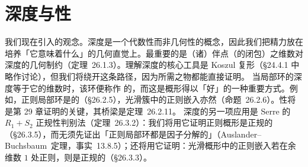 
\chapter{深度与\trCM{}性}
\label{ch:depth}

我们现在引入\trDepth{}的观念。深度是一个代数性而非几何性的概念，因此我们把精力放在培养「它意味着什么」的几何直觉上。最重要的是（诸）伴点（的闭包）之维数对深度的几何制约（\mbox{定理~26.1.3}）。理解深度的核心工具是 Koszul 复形（\S24.4.1 中略作讨论），但我们将绕开这条路径，因为所需之物都能直接证明。
当局部环的深度等于它的维数时，该环便称作 \trCM{}的，而这是概形得以「好」的一种重要方式。例如，正则局部环是\trCM{}的（\S26.2.5），光滑簇中的正则嵌入亦然（\mbox{命题~26.2.6}）。\trCM{}性将是第 29 章\trSerreDuality{}证明的关键，其桥梁是\mbox{\trMiracleFlat{}定理~26.2.11}。
深度的另一项应用是 Serre 的 $R_1+S_2$ 正规性判别法（\mbox{定理~26.3.2}）：我们将用它证明正则概形是正规的（\S26.3.5），而无须先证出「正则局部环都是因子分解的」（\mbox{Auslander--Buchsbaum 定理，事实~13.8.5}）；还将用它证明：光滑概形中的正则嵌入若在余维数 $1$ 处正则，则是正规的（\S26.3.3）。





